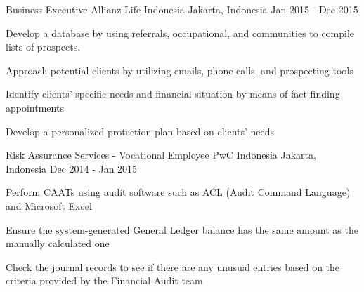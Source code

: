 \begin{cventries}
  \cventry
    {Business Executive} %
    {Allianz Life Indonesia} %
    {Jakarta, Indonesia} %
    {Jan 2015 - Dec 2015} %
    {
      \begin{cvitems} %
        \item {Develop a database by using referrals, occupational, and communities to compile lists of prospects.}
        \item {Approach potential clients by utilizing emails, phone calls, and prospecting tools}
        \item {Identify clients’ specific needs and financial situation by means of fact-finding appointments}
        \item {Develop a personalized protection plan based on clients’ needs}
      \end{cvitems}
    }

  \cventry
    {Risk Assurance Services - Vocational Employee} %
    {PwC Indonesia} %
    {Jakarta, Indonesia} %
    {Dec 2014 - Jan 2015} %
    {
      \begin{cvitems} %
        \item {Perform CAATs using audit software such as ACL (Audit Command Language) and Microsoft Excel}
        \item {Ensure the system-generated General Ledger balance has the same amount as the manually calculated one}
        \item {Check the journal records to see if there are any unusual entries based on the criteria provided by the Financial Audit team}
      \end{cvitems}
    }


\end{cventries}
